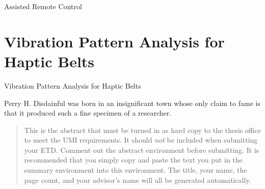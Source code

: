 \documentclass[12pt]{gatech-thesis}
\begin{document}
Assisted Remote Control

\chapter{Vibration Pattern Analysis for Haptic Belts}

Vibration Pattern Analysis for Haptic Belts


\begin{postliminary}
{}
\begin{vita}
Perry H. Disdainful was born in an insignificant town
whose only claim to fame is that it produced such a fine
specimen of a researcher.
\end{vita}
\end{postliminary}

\begin{abstract}
  This is the abstract that must be turned in as hard copy to the
  thesis office to meet the UMI requirements. It should \emph{not} be
  included when submitting your ETD. Comment out the abstract
  environment before submitting. It is recommended that you simply
  copy and paste the text you put in the summary environment into this
  environment. The title, your name, the page count, and your
  advisor's name will all be generated automatically.
\end{abstract}
\end{document}
